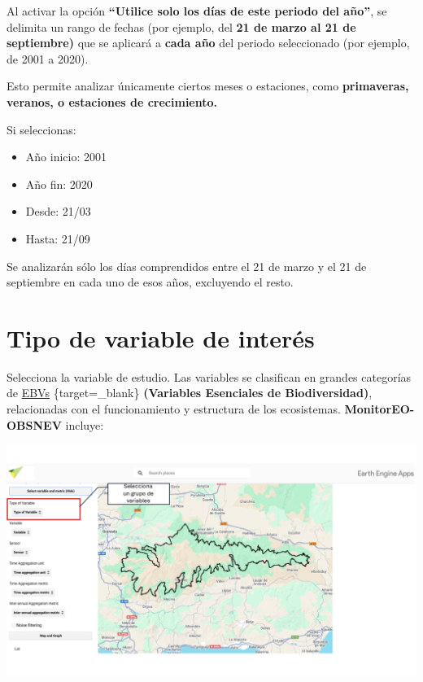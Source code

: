 \documentclass[
]{book}
\providecommand{\tightlist}{%
  \setlength{\itemsep}{0pt}\setlength{\parskip}{0pt}}
\begin{document}
Al activar la opción \textbf{``Utilice solo los días de este periodo del año''}, se delimita un rango de fechas (por ejemplo, del \textbf{21 de marzo al 21 de septiembre)} que se aplicará a \textbf{cada año} del periodo seleccionado (por ejemplo, de 2001 a 2020).

Esto permite analizar únicamente ciertos meses o estaciones, como \textbf{primaveras, veranos, o estaciones de crecimiento.}

Si seleccionas:

\begin{itemize}
\tightlist
\item
  Año inicio: 2001\\
\item
  Año fin: 2020\\
\item
  Desde: 21/03\\
\item
  Hasta: 21/09
\end{itemize}

Se analizarán sólo los días comprendidos entre el 21 de marzo y el 21 de septiembre en cada uno de esos años, excluyendo el resto.

\chapter{Tipo de variable de interés}\label{tipo-variable}

Selecciona la variable de estudio. Las variables se clasifican en grandes categorías de \href{https://geobon.org/ebvs/what-are-ebvs/}{EBVs} \{target=\_blank\} \textbf{(Variables Esenciales de Biodiversidad)}, relacionadas con el funcionamiento y estructura de los ecosistemas. \textbf{MonitorEO-OBSNEV} incluye:

\includegraphics{assets/variables_es.png}
\end{document}
